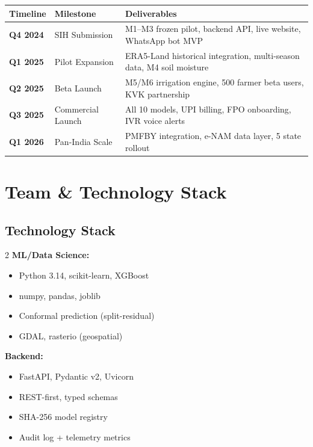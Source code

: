 \documentclass[12pt,a4paper]{article}
\begin{document}
\begin{center}
\small
\renewcommand{\arraystretch}{1.5}
\begin{tabular}{|p{2.5cm}|p{4cm}|p{7cm}|}
\hline
\rowcolor{primaryGreen}
\textbf{\color{white}Timeline} & \textbf{\color{white}Milestone} & \textbf{\color{white}Deliverables} \\
\hline
\textbf{Q4 2024} & SIH Submission & M1--M3 frozen pilot, backend API, live website, WhatsApp bot MVP \\
\hline
\textbf{Q1 2025} & Pilot Expansion & ERA5-Land historical integration, multi-season data, M4 soil moisture \\
\hline
\textbf{Q2 2025} & Beta Launch & M5/M6 irrigation engine, 500 farmer beta users, KVK partnership \\
\hline
\textbf{Q3 2025} & Commercial Launch & All 10 models, UPI billing, FPO onboarding, IVR voice alerts \\
\hline
\textbf{Q1 2026} & Pan-India Scale & PMFBY integration, e-NAM data layer, 5 state rollout \\
\hline
\end{tabular}
\end{center}

\section{Team \& Technology Stack}

\subsection{Technology Stack}

\begin{multicols}{2}
\textbf{ML/Data Science:}
\begin{itemize}[leftmargin=*,noitemsep]
  \item Python 3.14, scikit-learn, XGBoost
  \item numpy, pandas, joblib
  \item Conformal prediction (split-residual)
  \item GDAL, rasterio (geospatial)
\end{itemize}

\columnbreak

\textbf{Backend:}
\begin{itemize}[leftmargin=*,noitemsep]
  \item FastAPI, Pydantic v2, Uvicorn
  \item REST-first, typed schemas
  \item SHA-256 model registry
  \item Audit log + telemetry metrics
\end{itemize}
\end{multicols}
\end{document}
